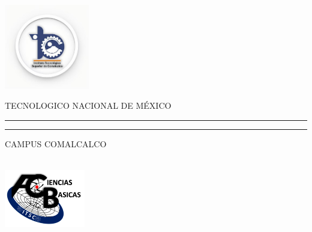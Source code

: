 \begin{titlepage}
	\begin{minipage}[c][0.17\textheight][c]{0.25\textwidth}
		\begin{center}
			\includegraphics[width=3.7cm, height=3.7cm]{LOGOTEC}
		\end{center}
	\end{minipage}
	\begin{minipage}[c][0.195\textheight][t]{0.75\textwidth}
		\begin{center}
			\vspace{0.3cm}
			\textsc{\large TECNOLOGICO NACIONAL DE MÉXICO}\\[0.5cm]
			\vspace{0.3cm}
			{\color{azulmarino}\hrule height2.5pt} %
			\vspace{.2cm}
			{\color{azulmarino}\hrule height1pt} %
			\vspace{.8cm}
			\textsc{CAMPUS COMALCALCO}\\[0.5cm] %
		\end{center}
	\end{minipage}
	
	\begin{minipage}[c][0.81\textheight][t]{0.25\textwidth}
		\vspace*{5mm}
		\begin{center}
			\hskip2.0mm
			{\color{azulmarino}\vrule width1pt height13cm} %
			\vspace{5mm}
			\hskip2pt
			{\color{azulmarino}\vrule width2.5pt height13cm} %
			\hskip2mm
			{\color{azulmarino}\vrule width1pt height13cm} \\ %
			\vspace{5mm}
			\includegraphics[height=2.5cm]{logob}
		\end{center}
	\end{minipage}
	\begin{minipage}[c][0.81\textheight][t]{0.75\textwidth}
		\begin{center}
			\vspace{0.5cm}
			

\end{center}
\end{minipage}
\end{titlepage}
